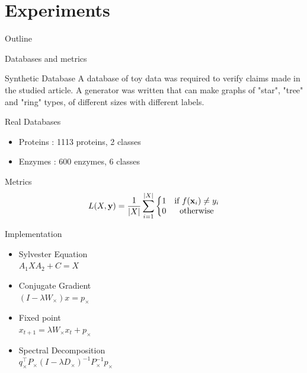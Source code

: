 \documentclass[compress]{beamer}
\DeclarePairedDelimiter{\abs}{\lvert}{\rvert}
\let\vec\mathbf
\begin{document}
\section{Experiments}
\begin{frame}{Outline}
  \tableofcontents[currentsection]
\end{frame}
\begin{frame}{Databases and metrics}
    \begin{block}{Synthetic Database}
    	A database of toy data was required to verify claims made in the studied article. A generator was written that can make graphs of "star", "tree" and "ring" types, of different sizes with different labels.
    \end{block}
	\pause
	\begin{block}{Real Databases}
		\begin{itemize}
			\item Proteins : 1113 proteins, 2 classes
			\item Enzymes : 600 enzymes, 6 classes
		\end{itemize}
	\end{block}
	\pause
	\begin{block}{Metrics}
		\begin{equation*}
		L(X,\vec{y})=\frac{1}{\abs{X}}\sum\limits_{i=1}^{\abs{X}}\left\{
		\begin{matrix}
		1 & \mbox{if } f(\vec{x}_i) \neq y_i \\
		0 & \mbox{otherwise}
		\end{matrix}
		\right.
		\end{equation*}
	\end{block}
\end{frame}
\begin{frame}{Implementation}
	\begin{multicols}{2}
		\begin{itemize}
			\setlength\itemsep{4em}
			\item Sylvester Equation\\$A_{1}XA_{2}+C=X$
			\pause
			\item Conjugate Gradient\\$(I-\lambda W_{\times})x=p_{\times}$
			\pause
			\setlength\itemsep{4em}
			\item Fixed point\\$x_{t+1}=\lambda W_{\times}x_{t}+p_{\times}$
			\pause
			\item Spectral Decomposition\\$q_{\times}^{\top}P_{\times}(I-\lambda D_{\times})^{-1}P_{\times}^{-1}p_{\times}$
		\end{itemize}
	\end{multicols}
\end{frame}
\end{document}
